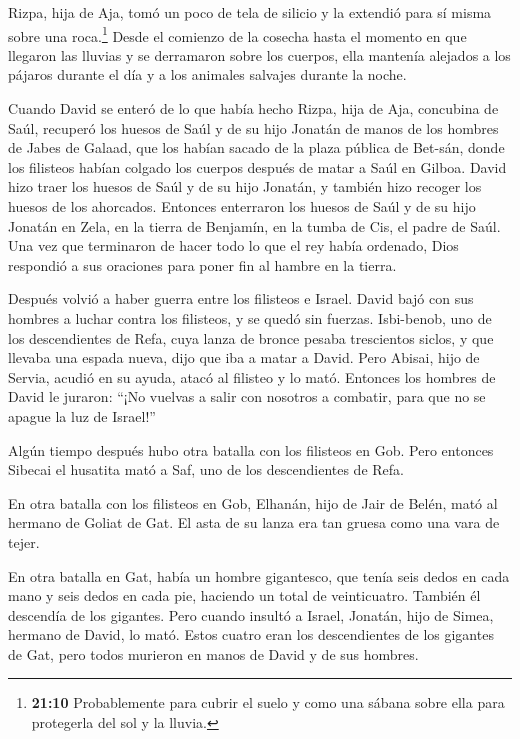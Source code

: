  Rizpa, hija de Aja, tomó un poco de tela de silicio y la
extendió para sí misma sobre una roca.\footnote{\textbf{21:10}
  Probablemente para cubrir el suelo y como una sábana sobre ella para
  protegerla del sol y la lluvia.} Desde el comienzo de la cosecha hasta
el momento en que llegaron las lluvias y se derramaron sobre los
cuerpos, ella mantenía alejados a los pájaros durante el día y a los
animales salvajes durante la noche.

 Cuando David se enteró de lo que había hecho Rizpa, hija
de Aja, concubina de Saúl,  recuperó los huesos de Saúl y
de su hijo Jonatán de manos de los hombres de Jabes de Galaad, que los
habían sacado de la plaza pública de Bet-sán, donde los filisteos habían
colgado los cuerpos después de matar a Saúl en Gilboa. 
David hizo traer los huesos de Saúl y de su hijo Jonatán, y también hizo
recoger los huesos de los ahorcados.  Entonces enterraron
los huesos de Saúl y de su hijo Jonatán en Zela, en la tierra de
Benjamín, en la tumba de Cis, el padre de Saúl. Una vez que terminaron
de hacer todo lo que el rey había ordenado, Dios respondió a sus
oraciones para poner fin al hambre en la tierra.

 Después volvió a haber guerra entre los filisteos e
Israel. David bajó con sus hombres a luchar contra los filisteos, y se
quedó sin fuerzas.  Isbi-benob, uno de los descendientes de
Refa, cuya lanza de bronce pesaba trescientos siclos, y que llevaba una
espada nueva, dijo que iba a matar a David.  Pero Abisai,
hijo de Servia, acudió en su ayuda, atacó al filisteo y lo mató.
Entonces los hombres de David le juraron: ``¡No vuelvas a salir con
nosotros a combatir, para que no se apague la luz de Israel!''

 Algún tiempo después hubo otra batalla con los filisteos
en Gob. Pero entonces Sibecai el husatita mató a Saf, uno de los
descendientes de Refa.

 En otra batalla con los filisteos en Gob, Elhanán, hijo de
Jair de Belén, mató al hermano de Goliat de Gat. El asta de su lanza era
tan gruesa como una vara de tejer.

 En otra batalla en Gat, había un hombre gigantesco, que
tenía seis dedos en cada mano y seis dedos en cada pie, haciendo un
total de veinticuatro. También él descendía de los gigantes.
 Pero cuando insultó a Israel, Jonatán, hijo de Simea,
hermano de David, lo mató.  Estos cuatro eran los
descendientes de los gigantes de Gat, pero todos murieron en manos de
David y de sus hombres.

